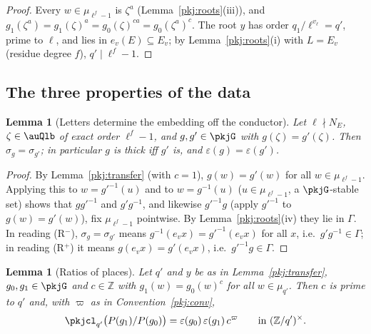 \documentclass[10pt]{amsart}
\newtheorem{lemma}[theorem]{Lemma}
\theoremstyle{definition}
\theoremstyle{remark}
\newcommand{\Z}{\mathbb Z}
\begin{document}
\begin{proof}
Every $w\in\mu_{\ell^f-1}$ is $\zeta^a$ (Lemma~\ref{pkj:roots}(iii)), and $g_1(\zeta^a)=g_1(\zeta)^a=
g_0(\zeta)^{ca}=g_0(\zeta^a)^c$. The root $y$ has order $q_1/\ell^{v_\ell}=q'$, prime to $\ell$, and lies
in $e_v(E)\subseteq E_v$; by Lemma~\ref{pkj:roots}(i) with $L=E_v$ (residue degree $f$), $q'\mid\ell^f-1$.
\end{proof}

\subsection{The three properties of the data}\label{pkj:ss-three}

\begin{lemma}[Letters determine the embedding off the conductor]\label{pkj:letter-det}
Let $\ell\nmid N_E$, $\zeta\in\auQlb$ of exact order $\ell^f-1$, and $g,g'\in\pkjG$ with $g(\zeta)=g'(\zeta)$.
Then $\sigma_g=\sigma_{g'}$; in particular $g$ is thick iff $g'$ is, and $\varepsilon(g)=\varepsilon(g')$.
\end{lemma}

\begin{proof}
By Lemma~\ref{pkj:transfer} (with $c=1$), $g(w)=g'(w)$ for all $w\in\mu_{\ell^f-1}$. Applying this to
$w=g'^{-1}(u)$ and to $w=g^{-1}(u)$ ($u\in\mu_{\ell^f-1}$, a $\pkjG$-stable set) shows that $g g'^{-1}$
and $g'g^{-1}$, and likewise $g'^{-1}g$ (apply $g'^{-1}$ to $g(w)=g'(w)$), fix $\mu_{\ell^f-1}$
pointwise. By Lemma~\ref{pkj:roots}(iv) they lie in $\Gamma$. In reading (R$^-$),
$\sigma_g=\sigma_{g'}$ means $g^{-1}(e_v x)=g'^{-1}(e_v x)$ for all $x$, i.e.\ $g'g^{-1}\in\Gamma$; in
reading (R$^+$) it means $g(e_vx)=g'(e_vx)$, i.e.\ $g'^{-1}g\in\Gamma$.
\end{proof}

\begin{lemma}[Ratios of places]\label{pkj:ratio}
Let $q'$ and $y$ be as in Lemma~\ref{pkj:transfer}, $g_0,g_1\in\pkjG$ and $c\in\Z$ with
$g_1(w)=g_0(w)^c$ for all $w\in\mu_{q'}$. Then $c$ is prime to $q'$ and, with $\varpi$ as in
Convention~\ref{pkj:conv},
\[
\pkjcl_{q'}\bigl(P(g_1)/P(g_0)\bigr)=\varepsilon(g_0)\,\varepsilon(g_1)\,c^{\varpi}\qquad\text{in }(\Z/q')^\times .
\]
\end{lemma}
\end{document}
